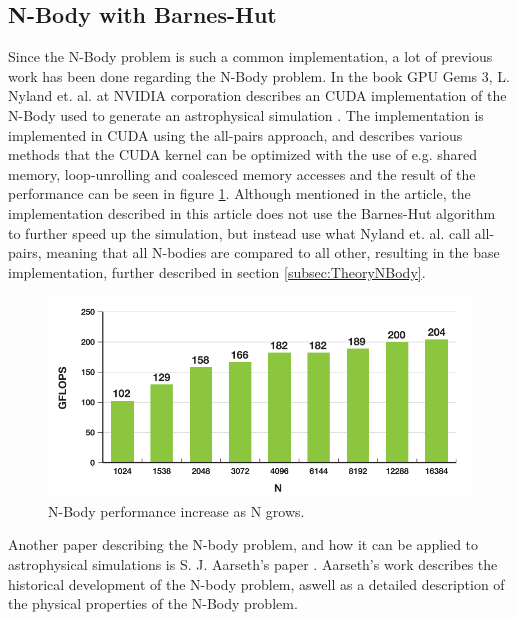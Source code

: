 \subsection{N-Body with Barnes-Hut}
Since the N-Body problem is such a common implementation, a lot of previous work has been done regarding the N-Body problem. In the book GPU Gems 3, L. Nyland et. al. at NVIDIA corporation describes an CUDA implementation of the N-Body used to generate an astrophysical simulation \cite{nyland2007fast}. The implementation is implemented in CUDA using the all-pairs approach, and describes various methods that the CUDA kernel can be optimized with the use of e.g. shared memory, loop-unrolling and coalesced memory accesses and the result of the performance can be seen in figure \ref{fig:GPUGemsNBodyPerformance}. Although mentioned in the article, the implementation described in this article does not use the Barnes-Hut algorithm to further speed up the simulation, but instead use what Nyland et. al. call all-pairs, meaning that all N-bodies are compared to all other, resulting in the base implementation, further described in section \ref{subsec:TheoryNBody}. 

\begin{figure}[!htpb]
    \centering
    \includegraphics[width=\textwidth]{Introduction/Figs/GPUGemsNBodyComparison.png}
    \caption{N-Body performance increase as N grows. \cite{nyland2007fast}}
    \label{fig:GPUGemsNBodyPerformance}
\end{figure}

Another paper describing the N-body problem, and how it can be applied to astrophysical simulations is S. J. Aarseth's paper \cite{aarseth2003gravitational}. Aarseth's work describes the historical development of the N-body problem, aswell as a detailed description of the physical properties of the N-Body problem.


